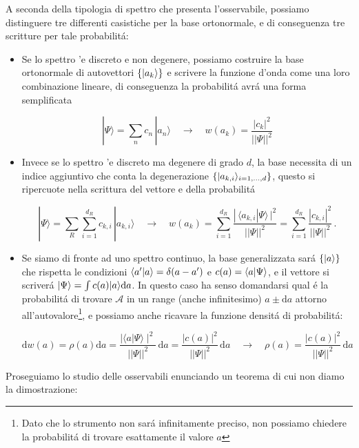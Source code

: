 A seconda della tipologia di spettro che presenta l'osservabile, possiamo distinguere tre differenti casistiche per la base ortonormale, e di conseguenza tre scritture per tale probabilit\'a:
\begin{itemize}
	\item Se lo spettro 'e discreto e non degenere, possiamo costruire la base ortonormale di autovettori $\{\ket{a_k}\}$ e scrivere la funzione d'onda come una loro combinazione lineare, di conseguenza la probabilit\'a avr\'a una forma semplificata

	$$|\Psi\rangle=\sum_{n}c_{n}\,|a_{n}\rangle\quad\longrightarrow\quad w(a_{k})={\frac{|c_{k}|^{2}}{||\Psi||^{2}}}$$

	\item Invece se lo spettro 'e discreto ma degenere di grado $d$, la base necessita di un indice aggiuntivo che conta la degenerazione $\{ \ket{a_{k,i}}_{i=1,...,d}\}$, questo si ripercuote nella scrittura del vettore e della probabilit\'a

	$$|\Psi\rangle=\sum_{R}\sum_{i=1}^{d_{R}}c_{k,i}\,|a_{k,i}\rangle\quad\longrightarrow\quad w(a_{k})=\sum_{i=1}^{d_{R}}\frac{|\,\langle a_{k,i}|\Psi\rangle\,|^{2}}{||\Psi||^{2}}=\sum_{i=1}^{d_{R}}\frac{|c_{k,i}|^{2}}{||\Psi||^{2}}\,.$$

	\item Se siamo di fronte ad uno spettro continuo, la base generalizzata sar\'a $\{\ket{a}\}$ che rispetta le condizioni $\braket{a^\prime}{a} = \delta(a-a^\prime)$ e $c(a) = \braket{a}{\Psi}$, e il vettore si scriver\'a $\ket{\Psi} = \int c(a)\ket{a} \mathrm{d}a$. In questo caso ha senso domandarsi qual \'e la probabilit\'a di trovare $\mathcal{A}$ in un range (anche infinitesimo) $a \pm \mathrm{d}a$ attorno all'autovalore\footnote{Dato che lo strumento non sar\'a infinitamente preciso, non possiamo chiedere la probabilit\'a di trovare esattamente il valore $a$}, e possiamo anche ricavare la funzione densit\'a di probabilit\'a:

	$$\mathrm{d} w(a)=\rho(a)\mathrm{d} a={\frac{\mid\langle a|\Psi\rangle\mid^{2}}{||\Psi||^{2}}}\,\mathrm{d}a={\frac{|c(a)|^{2}}{||\Psi||^{2}}}\,\mathrm{d}a\quad\longrightarrow\quad\rho(a)={\frac{|c(a)|^{2}}{||\Psi||^{2}}}\,\mathrm{d}a$$
\end{itemize}

Proseguiamo lo studio delle osservabili enunciando un teorema di cui non diamo la dimostrazione:


